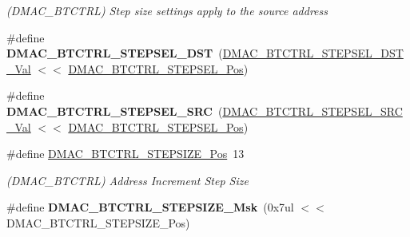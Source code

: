 \begin{DoxyCompactItemize}
\begin{DoxyCompactList}\small\item\em (D\+M\+A\+C\+\_\+\+B\+T\+C\+T\+R\+L) Step size settings apply to the source address \end{DoxyCompactList}\item 
\hypertarget{group___s_a_m_l21___d_m_a_c_ga24cef7225b974c8754c19ff095c2c56e}{}\#define {\bfseries D\+M\+A\+C\+\_\+\+B\+T\+C\+T\+R\+L\+\_\+\+S\+T\+E\+P\+S\+E\+L\+\_\+\+D\+S\+T}~(\hyperlink{group___s_a_m_l21___d_m_a_c_gaa8bca72306ade35c2c8c0b06b1afe80d}{D\+M\+A\+C\+\_\+\+B\+T\+C\+T\+R\+L\+\_\+\+S\+T\+E\+P\+S\+E\+L\+\_\+\+D\+S\+T\+\_\+\+Val}   $<$$<$ \hyperlink{group___s_a_m_l21___d_m_a_c_ga2ccb7639cc6f4d7e9446f5eb9ef92bb3}{D\+M\+A\+C\+\_\+\+B\+T\+C\+T\+R\+L\+\_\+\+S\+T\+E\+P\+S\+E\+L\+\_\+\+Pos})\label{group___s_a_m_l21___d_m_a_c_ga24cef7225b974c8754c19ff095c2c56e}

\item 
\hypertarget{group___s_a_m_l21___d_m_a_c_ga2bc5b42df7eba0f3965acf659f8010d3}{}\#define {\bfseries D\+M\+A\+C\+\_\+\+B\+T\+C\+T\+R\+L\+\_\+\+S\+T\+E\+P\+S\+E\+L\+\_\+\+S\+R\+C}~(\hyperlink{group___s_a_m_l21___d_m_a_c_ga4bbc579e64b22419578173c2d2d42bc0}{D\+M\+A\+C\+\_\+\+B\+T\+C\+T\+R\+L\+\_\+\+S\+T\+E\+P\+S\+E\+L\+\_\+\+S\+R\+C\+\_\+\+Val}   $<$$<$ \hyperlink{group___s_a_m_l21___d_m_a_c_ga2ccb7639cc6f4d7e9446f5eb9ef92bb3}{D\+M\+A\+C\+\_\+\+B\+T\+C\+T\+R\+L\+\_\+\+S\+T\+E\+P\+S\+E\+L\+\_\+\+Pos})\label{group___s_a_m_l21___d_m_a_c_ga2bc5b42df7eba0f3965acf659f8010d3}

\item 
\hypertarget{group___s_a_m_l21___d_m_a_c_gacf7558693207543fbd9048f7f76fa238}{}\#define \hyperlink{group___s_a_m_l21___d_m_a_c_gacf7558693207543fbd9048f7f76fa238}{D\+M\+A\+C\+\_\+\+B\+T\+C\+T\+R\+L\+\_\+\+S\+T\+E\+P\+S\+I\+Z\+E\+\_\+\+Pos}~13\label{group___s_a_m_l21___d_m_a_c_gacf7558693207543fbd9048f7f76fa238}

\begin{DoxyCompactList}\small\item\em (D\+M\+A\+C\+\_\+\+B\+T\+C\+T\+R\+L) Address Increment Step Size \end{DoxyCompactList}\item 
\hypertarget{group___s_a_m_l21___d_m_a_c_ga3b36dfe09a581a4f545b8ecfb7add11e}{}\#define {\bfseries D\+M\+A\+C\+\_\+\+B\+T\+C\+T\+R\+L\+\_\+\+S\+T\+E\+P\+S\+I\+Z\+E\+\_\+\+Msk}~(0x7ul $<$$<$ D\+M\+A\+C\+\_\+\+B\+T\+C\+T\+R\+L\+\_\+\+S\+T\+E\+P\+S\+I\+Z\+E\+\_\+\+Pos)\label{group___s_a_m_l21___d_m_a_c_ga3b36dfe09a581a4f545b8ecfb7add11e}


\end{DoxyCompactItemize}
